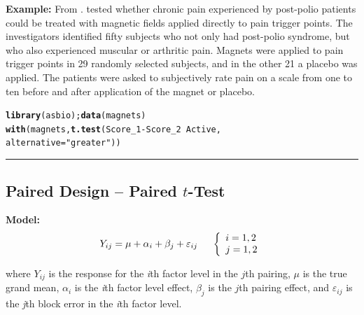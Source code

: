 \documentclass[12pt,english]{article}\usepackage[]{graphicx}\usepackage[table]{xcolor}
\makeatletter
\newcommand{\hlsng}[1]{\textcolor[rgb]{0.192,0.494,0.8}{#1}}%
\newcommand{\hlopt}[1]{\textcolor[rgb]{0,0,0}{#1}}%
\newcommand{\hldef}[1]{\textcolor[rgb]{0.345,0.345,0.345}{#1}}%
\newcommand{\hlkwc}[1]{\textcolor[rgb]{0.333,0.667,0.333}{#1}}%
\newcommand{\hlkwd}[1]{\textcolor[rgb]{0.737,0.353,0.396}{\textbf{#1}}}%
\newenvironment{kframe}{%
 \def\at@end@of@kframe{}%
 \ifinner\ifhmode%
  \def\at@end@of@kframe{\end{minipage}}%
  \begin{minipage}{\columnwidth}%
 \fi\fi%
 \def\FrameCommand##1{\hskip\@totalleftmargin \hskip-\fboxsep
 \colorbox{shadecolor}{##1}\hskip-\fboxsep
     \hskip-\linewidth \hskip-\@totalleftmargin \hskip\columnwidth}%
 \MakeFramed {\advance\hsize-\width
   \@totalleftmargin\z@ \linewidth\hsize
   \@setminipage}}%
 {\par\unskip\endMakeFramed%
 \at@end@of@kframe}
\newenvironment{knitrout}{}{} %
\makeatother
\begin{document}
\begin{tcolorbox}[colback=yellow!50!red!25!white,colbacktitle=yellow!50!red,colframe=black!75!white,title=\textbf{R:} Welch $t$-Test]
\textbf{Example:} From \citep[][pg 217-218]{aho2014}.  \citet{vallbona1997} tested whether chronic pain experienced by post-polio patients could be treated with magnetic fields applied directly to pain trigger points. The investigators identified fifty subjects who not only had post-polio syndrome, but who also experienced muscular or arthritic pain. Magnets were applied to pain trigger points in 29 randomly selected subjects, and in the other 21 a placebo was applied. The patients were asked to subjectively rate pain on a scale from one to ten before and after application of the magnet or placebo.
\vspace{-.1in}
\begin{knitrout}
\color{fgcolor}\begin{kframe}
\begin{alltt}
\hlkwd{library}\hldef{(asbio);} \hlkwd{data}\hldef{(magnets)}
\hlkwd{with}\hldef{(magnets,} \hlkwd{t.test}\hldef{(Score_1} \hlopt{-} \hldef{Score_2} \hlopt{~} \hldef{Active,}
                     \hlkwc{alternative} \hldef{=} \hlsng{"greater"}\hldef{))}
\end{alltt}
\end{kframe}
\end{knitrout}
\end{tcolorbox}
\par\noindent\rule{.9\textwidth}{0.4pt}

\subsection{Paired Design -- Paired $t$-Test}

\noindent \textbf{Model:} \[Y_{ij} = \mu + \alpha_i + \beta_j + \varepsilon_{ij}  \hspace{0.2in} \left\{
                \begin{array}{ll}
                  i = 1,2\\
                  j = 1,2\\
              \end{array}
              \right.\]

\noindent where $Y_{ij}$ is the response for the \textit{i}th factor level in the $j$th pairing, $\mu$ is the true grand mean, $\alpha_i$ is the \textit{i}th factor level effect, $\beta_j$ is the $j$th pairing effect, and $\varepsilon_{ij}$ is the \textit{j}th block error in the \textit{i}th factor level. \\
\vspace{0.05in}
\end{document}

